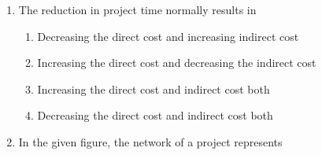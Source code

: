 \documentclass[11pt,a4paper]{article}
\begin{document}
\begin{enumerate}
\begin{enumerate}[label=\Alph*.]
\end{enumerate}
\item{The reduction in project time normally results in}
\begin{enumerate}[label=\Alph*.]
\item{Decreasing the direct cost and increasing indirect cost}
\item{Increasing the direct cost and decreasing the indirect cost}
\item{Increasing the direct cost and indirect cost both}
\item{Decreasing the direct cost and indirect cost both}
\end{enumerate}
\item{In the given figure, the network of a project represents \\

}
\end{enumerate}
\end{document}
